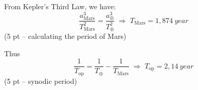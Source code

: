 
From Kepler's Third Law, we have:
\[
\frac{a_{\mathrm{Mars}}^3}{T_{\mathrm{Mars}}^2} = \frac{a_\oplus^3}{T_\oplus^2}
\;\Rightarrow\; T_{\mathrm{Mars}} = 1{,}874\ year
\]
\hfill(5 pt -- calculating the period of Mars)

Thus
\[
\frac{1}{T_{\mathrm{op}}} = \frac{1}{T_\oplus} - \frac{1}{T_{\mathrm{Mars}}}
\;\Rightarrow\; T_{\mathrm{op}} = 2{,}14\ year
\]
\hfill(5 pt -- synodic period)
